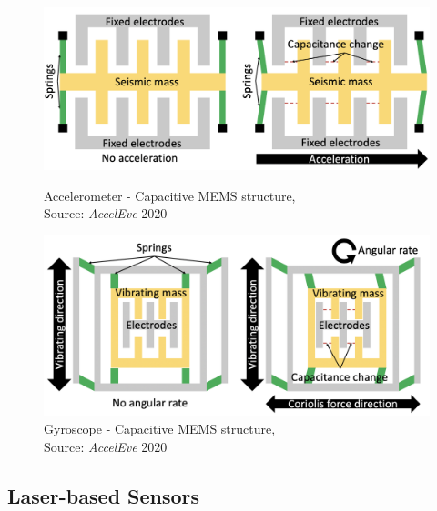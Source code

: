 \documentclass[sigconf, nonacm]{acmart}
\begin{document}
\begin{figure}[H]
\centering
\includegraphics[width=\linewidth]{embed/MEMS_accelerometer.png}
\caption{Accelerometer - Capacitive MEMS structure, \\Source: \textit{AccelEve} 2020 \cite{AccelEve2020}}
\label{fig:MEMS_accelerometer}

\vspace{0.25cm}

\includegraphics[width=\linewidth]{embed/MEMS_gyroscope.png}
\caption{Gyroscope - Capacitive MEMS structure, \\Source: \textit{AccelEve} 2020 \cite{AccelEve2020}}
\label{fig:MEMS_gyroscope}
\end{figure}

\subsection{Laser-based Sensors}
\end{document}
